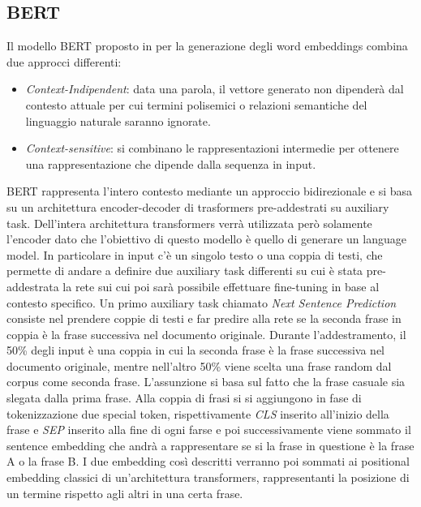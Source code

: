 \newpage

\subsection{BERT}
Il modello BERT proposto in \cite{devlin2019bert} per la generazione degli word embeddings combina due approcci differenti: 
\begin{itemize}
    \item \textit{Context-Indipendent}: data una parola, il vettore generato non dipenderà dal contesto attuale per cui termini polisemici o relazioni semantiche del linguaggio naturale saranno ignorate.
    \item \textit{Context-sensitive}: si combinano le rappresentazioni intermedie per ottenere una rappresentazione che dipende dalla sequenza in input.
\end{itemize}
BERT rappresenta l'intero contesto mediante un approccio bidirezionale e si basa su un architettura encoder-decoder di trasformers pre-addestrati su auxiliary task. Dell'intera architettura transformers verrà utilizzata però solamente l'encoder dato che l'obiettivo di questo modello è quello di generare un language model. 
In particolare in input c'è un singolo testo o una coppia di testi, che permette di andare a definire due auxiliary task differenti su cui è stata pre-addestrata la rete sui cui poi sarà possibile effettuare fine-tuning in base al contesto specifico. \newline
Un primo auxiliary task chiamato \textit{Next Sentence Prediction} consiste nel prendere coppie di testi e far predire alla rete se la seconda frase in coppia  è la frase successiva nel documento originale. Durante l'addestramento, il 50\% degli input è una coppia in cui la seconda frase è la frase successiva nel documento originale, mentre nell'altro 50\% viene scelta una frase random dal corpus come seconda frase. L'assunzione si basa sul fatto che la frase casuale sia slegata dalla prima frase.
\newline
Alla coppia di frasi si si aggiungono in fase di tokenizzazione due special token, rispettivamente \textit{CLS} inserito all'inizio della frase e \textit{SEP} inserito alla fine di ogni farse e poi successivamente viene sommato il sentence embedding che andrà a rappresentare se si la frase in questione è la frase A o la frase B. I due embedding così descritti verranno poi sommati ai positional embedding classici di un'architettura transformers, rappresentanti la posizione di un termine rispetto agli altri in una certa frase.\newline
